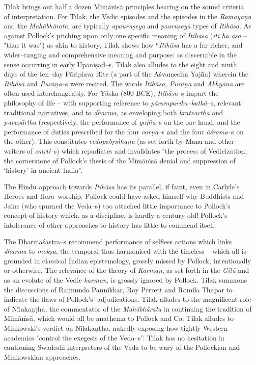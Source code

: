 Tilak brings out half a dozen Mīmāṁsā principles bearing on the sound criteria of interpretation. For Tilak, the Vedic episodes and the episodes in the \textit{Rāmāyaṇa} and the \textit{Mahābhārata}, are typically \textit{apauruṣeya} and \textit{pauruṣeya} types of \textit{Itihāsa}. As against Pollock’s pitching upon only one specific meaning of \textit{Itihāsa} (\textit{iti ha āsa} – "thus it was") as akin to history, Tilak shows how “\textit{Itihāsa} has a far richer, and wider–ranging and comprehensive meaning and purpose: as discernible in the sense occurring in early Upaniṣad–s. Tilak also alludes to the eight and ninth days of the ten–day Pāriplava Rite (a part of the Aśvamedha Yajña) wherein the \textit{Itihāsa} and \textit{Purāṇa}–s were recited. The words \textit{Itihāsa, Purāṇa} and \textit{Ākhyāna} are often used interchangeably. For Yāska (800 BCE), \textit{Itihāsa}–s impart the philosophy of life – with supporting reference to \textit{pāramparika–kathā}–s, relevant traditional narratives, and to \textit{dharma}, as enveloping both \textit{kratvartha} and \textit{puruṣārtha} (respectively, the performance of \textit{yajña}–s on the one hand, and the performance of duties prescribed for the four \textit{varṇa}–s and the four \textit{āśrama}–s on the other). This constitutes \textit{vedopabṛṁhaṇa} (as set forth by Manu and other writers of \textit{smṛti}–s) which repudiates and invalidates "the process of Vedicization, the cornerstone of Pollock’s thesis of the Mīmāṁsā denial and suppression of ‘history’ in ancient India”. 

The Hindu approach towards \textit{Itihāsa} has its parallel, if faint, even in Carlyle’s Heroes and Hero–worship. Pollock could have asked himself why Buddhists and Jains (who spurned the Veda–s) too attached little importance to Pollock’s concept of history which, as a discipline, is hardly a century old! Pollock’s intolerance of other approaches to history has little to commend itself.

The Dharmaśāstra–s recommend performance of selfless actions which links \textit{dharma} to \textit{mokṣa}, the temporal thus harmonised with the timeless – which all is grounded in classical Indian epistemology, grossly missed by Pollock, intentionally or otherwise. The relevance of the theory of \textit{Karman}, as set forth in the \textit{Gītā} and as an evolute of the Vedic \textit{karman}, is grossly ignored by Pollock. Tilak summons the discussions of Raimundo Pannikkar, Roy Perrett and Romila Thapar to indicate the flaws of Pollock’s’ adjudications. Tilak alludes to the magnificent role of Nīlakaṇṭha, the commentator of the \textit{Mahābhārata} in continuing the tradition of Mīmāṁsā, which would all be anathema to Pollock and Co. Tilak alludes to Minkowski’s verdict on Nīlakaṇṭha, nakedly exposing how tightly Western academics "control the exegesis of the Veda–s”. Tilak has no hesitation in cautioning Swadeshi interpreters of the Veda to be wary of the Pollockian and Minkowskian approaches.


